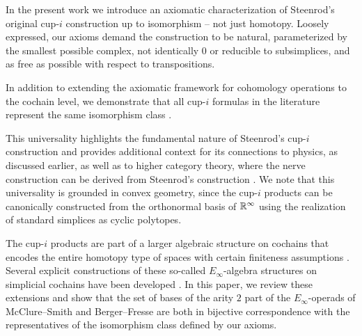 In the present work we introduce an axiomatic characterization of Steenrod's original \mbox{cup-$i$} construction up to isomorphism -- not just homotopy.
Loosely expressed, our axioms demand the construction to be natural, parameterized by the smallest possible complex, not identically $0$ or reducible to subsimplices, and as free as possible with respect to transpositions.

In addition to extending the axiomatic framework for cohomology operations \cite{serre1053eilenberg_maclane, cartan1955iteration, steenrod1962cohomology} to the cochain level, we demonstrate that all cup-$i$ formulas in the literature \cite{steenrod1947products, real1996computability, mcclure2003multivariable, berger2004combinatorial, medina2020prop1, medina2023fast_sq} represent the same isomorphism class \cite{medina2024polycat}.

This universality highlights the fundamental nature of Steenrod's \mbox{cup-$i$} construction and provides additional context for its connections to physics, as discussed earlier, as well as to higher category theory, where the nerve construction can be derived from Steenrod's construction \cite{street1987orientals, medina2020globular}.
We note that this universality is grounded in convex geometry, since the cup-$i$ products can be canonically constructed from the orthonormal basis of $\mathbb{R}^\infty$ using the realization of standard simplices as cyclic polytopes.

The cup-$i$ products are part of a larger algebraic structure on cochains that encodes the entire homotopy type of spaces with certain finiteness assumptions \cite{mandell2006homotopy_type}.
Several explicit constructions of these so-called $E_\infty$-algebra structures on simplicial cochains have been developed \cite{mcclure2003multivariable, berger2004combinatorial, medina2020prop1}.
In this paper, we review these extensions and show that the set of bases of the arity $2$ part of the $E_\infty$-operads of McClure--Smith and Berger--Fresse are both in bijective correspondence with the representatives of the isomorphism class defined by our axioms.